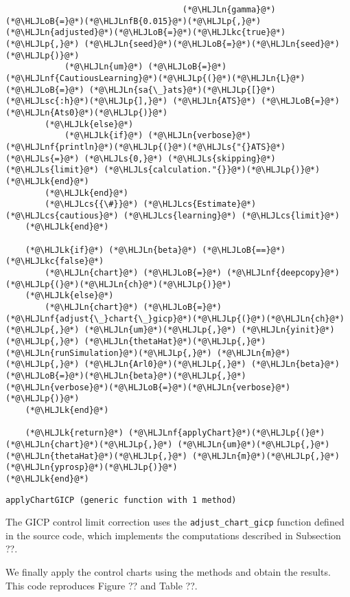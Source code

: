 \documentclass[12pt,a4paper]{article}
\newcommand{\HLJLk}[1]{\textcolor[RGB]{148,91,176}{\textbf{#1}}}
\newcommand{\HLJLkc}[1]{\textcolor[RGB]{59,151,46}{\textit{#1}}}
\newcommand{\HLJLn}[1]{#1}
\newcommand{\HLJLnf}[1]{\textcolor[RGB]{66,102,213}{#1}}
\newcommand{\HLJLs}[1]{\textcolor[RGB]{201,61,57}{#1}}
\newcommand{\HLJLsc}[1]{\textcolor[RGB]{201,61,57}{#1}}
\newcommand{\HLJLnfB}[1]{\textcolor[RGB]{59,151,46}{#1}}
\newcommand{\HLJLoB}[1]{\textcolor[RGB]{102,102,102}{\textbf{#1}}}
\newcommand{\HLJLp}[1]{#1}
\newcommand{\HLJLcs}[1]{\textcolor[RGB]{153,153,119}{\textit{#1}}}
\begin{document}
\begin{lstlisting}
                                    (*@\HLJLn{gamma}@*)(*@\HLJLoB{=}@*)(*@\HLJLnfB{0.015}@*)(*@\HLJLp{,}@*) (*@\HLJLn{adjusted}@*)(*@\HLJLoB{=}@*)(*@\HLJLkc{true}@*)(*@\HLJLp{,}@*) (*@\HLJLn{seed}@*)(*@\HLJLoB{=}@*)(*@\HLJLn{seed}@*)(*@\HLJLp{)}@*)
            (*@\HLJLn{um}@*) (*@\HLJLoB{=}@*) (*@\HLJLnf{CautiousLearning}@*)(*@\HLJLp{(}@*)(*@\HLJLn{L}@*) (*@\HLJLoB{=}@*) (*@\HLJLn{sa{\_}ats}@*)(*@\HLJLp{[}@*)(*@\HLJLsc{:h}@*)(*@\HLJLp{],}@*) (*@\HLJLn{ATS}@*) (*@\HLJLoB{=}@*) (*@\HLJLn{Ats0}@*)(*@\HLJLp{)}@*)
        (*@\HLJLk{else}@*)
            (*@\HLJLk{if}@*) (*@\HLJLn{verbose}@*) (*@\HLJLnf{println}@*)(*@\HLJLp{(}@*)(*@\HLJLs{"{}ATS}@*) (*@\HLJLs{=}@*) (*@\HLJLs{0,}@*) (*@\HLJLs{skipping}@*) (*@\HLJLs{limit}@*) (*@\HLJLs{calculation."{}}@*)(*@\HLJLp{)}@*) (*@\HLJLk{end}@*)
        (*@\HLJLk{end}@*)
        (*@\HLJLcs{{\#}}@*) (*@\HLJLcs{Estimate}@*) (*@\HLJLcs{cautious}@*) (*@\HLJLcs{learning}@*) (*@\HLJLcs{limit}@*)
    (*@\HLJLk{end}@*)

    (*@\HLJLk{if}@*) (*@\HLJLn{beta}@*) (*@\HLJLoB{==}@*) (*@\HLJLkc{false}@*)
        (*@\HLJLn{chart}@*) (*@\HLJLoB{=}@*) (*@\HLJLnf{deepcopy}@*)(*@\HLJLp{(}@*)(*@\HLJLn{ch}@*)(*@\HLJLp{)}@*)
    (*@\HLJLk{else}@*)
        (*@\HLJLn{chart}@*) (*@\HLJLoB{=}@*) (*@\HLJLnf{adjust{\_}chart{\_}gicp}@*)(*@\HLJLp{(}@*)(*@\HLJLn{ch}@*)(*@\HLJLp{,}@*) (*@\HLJLn{um}@*)(*@\HLJLp{,}@*) (*@\HLJLn{yinit}@*)(*@\HLJLp{,}@*) (*@\HLJLn{thetaHat}@*)(*@\HLJLp{,}@*) (*@\HLJLn{runSimulation}@*)(*@\HLJLp{,}@*) (*@\HLJLn{m}@*)(*@\HLJLp{,}@*) (*@\HLJLn{Arl0}@*)(*@\HLJLp{,}@*) (*@\HLJLn{beta}@*)(*@\HLJLoB{=}@*)(*@\HLJLn{beta}@*)(*@\HLJLp{,}@*) (*@\HLJLn{verbose}@*)(*@\HLJLoB{=}@*)(*@\HLJLn{verbose}@*)(*@\HLJLp{)}@*)
    (*@\HLJLk{end}@*)

    (*@\HLJLk{return}@*) (*@\HLJLnf{applyChart}@*)(*@\HLJLp{(}@*)(*@\HLJLn{chart}@*)(*@\HLJLp{,}@*) (*@\HLJLn{um}@*)(*@\HLJLp{,}@*) (*@\HLJLn{thetaHat}@*)(*@\HLJLp{,}@*) (*@\HLJLn{m}@*)(*@\HLJLp{,}@*) (*@\HLJLn{yprosp}@*)(*@\HLJLp{)}@*)
(*@\HLJLk{end}@*)
\end{lstlisting}

\begin{lstlisting}
applyChartGICP (generic function with 1 method)
\end{lstlisting}


The GICP control limit correction uses the \texttt{adjust\_chart\_gicp} function defined in the source code, which implements the computations described in Subsection ??.

We finally apply the control charts using the methods and obtain the results.  This code reproduces Figure ?? and Table ??.
\end{document}
